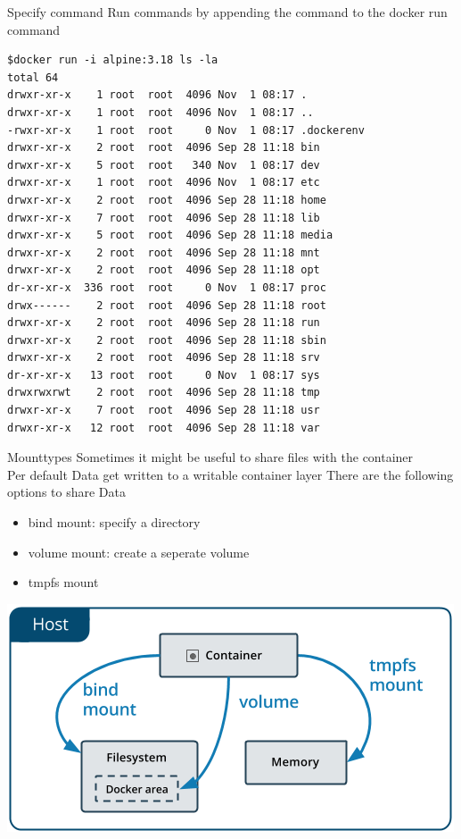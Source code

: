 \documentclass[12pt]{beamer}
\begin{document}
\begin{frame}[fragile]{Specify command}
    Run commands by appending the command to the docker run command
    \begin{lstlisting}[language=OwnBash, basicstyle=\tiny]
$docker run -i alpine:3.18 ls -la
total 64
drwxr-xr-x    1 root  root  4096 Nov  1 08:17 .
drwxr-xr-x    1 root  root  4096 Nov  1 08:17 ..
-rwxr-xr-x    1 root  root     0 Nov  1 08:17 .dockerenv
drwxr-xr-x    2 root  root  4096 Sep 28 11:18 bin
drwxr-xr-x    5 root  root   340 Nov  1 08:17 dev
drwxr-xr-x    1 root  root  4096 Nov  1 08:17 etc
drwxr-xr-x    2 root  root  4096 Sep 28 11:18 home
drwxr-xr-x    7 root  root  4096 Sep 28 11:18 lib
drwxr-xr-x    5 root  root  4096 Sep 28 11:18 media
drwxr-xr-x    2 root  root  4096 Sep 28 11:18 mnt
drwxr-xr-x    2 root  root  4096 Sep 28 11:18 opt
dr-xr-xr-x  336 root  root     0 Nov  1 08:17 proc
drwx------    2 root  root  4096 Sep 28 11:18 root
drwxr-xr-x    2 root  root  4096 Sep 28 11:18 run
drwxr-xr-x    2 root  root  4096 Sep 28 11:18 sbin
drwxr-xr-x    2 root  root  4096 Sep 28 11:18 srv
dr-xr-xr-x   13 root  root     0 Nov  1 08:17 sys
drwxrwxrwt    2 root  root  4096 Sep 28 11:18 tmp
drwxr-xr-x    7 root  root  4096 Sep 28 11:18 usr
drwxr-xr-x   12 root  root  4096 Sep 28 11:18 var
    \end{lstlisting}
\end{frame}

\begin{frame}[fragile]{Mounttypes}
    Sometimes it might be useful to share files with the container\\
    Per default Data get written to a writable container layer
    There are the following options to share Data \cite{docker_mounttypes}
    \begin{itemize}[label=\textcolor{black}{\textbullet}]
        \item bind mount: specify a directory
        \item volume mount: create a seperate volume 
        \item tmpfs mount
    \end{itemize}
    \begin{center}
        \includegraphics[height=0.4\textheight]{images/types-of-mounts.png}
    \end{center}
\end{frame}
\end{document}

